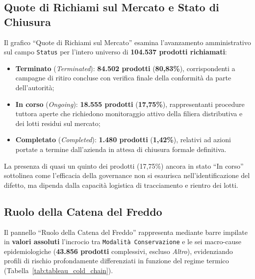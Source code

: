 
\subsection{Quote di Richiami sul Mercato e Stato di Chiusura}

Il grafico ``Quote di Richiami sul Mercato'' esamina l'avanzamento amministrativo sul campo \texttt{Status} per l'intero universo di \textbf{104.537 prodotti richiamati}:
\begin{itemize}
    \item \textbf{Terminato} (\textit{Terminated}): \textbf{84.502 prodotti} (\textbf{80,83\%}), corrispondenti a campagne di ritiro concluse con verifica finale della conformità da parte dell'autorità;
    \item \textbf{In corso} (\textit{Ongoing}): \textbf{18.555 prodotti} (\textbf{17,75\%}), rappresentanti procedure tuttora aperte che richiedono monitoraggio attivo della filiera distributiva e dei lotti residui sul mercato;
    \item \textbf{Completato} (\textit{Completed}): \textbf{1.480 prodotti} (\textbf{1,42\%}), relativi ad azioni portate a termine dall'azienda in attesa di chiusura formale definitiva.
\end{itemize}
La presenza di quasi un quinto dei prodotti (17,75\%) ancora in stato ``In corso'' sottolinea come l'efficacia della governance non si esaurisca nell'identificazione del difetto, ma dipenda dalla capacità logistica di tracciamento e rientro dei lotti.

\subsection{Ruolo della Catena del Freddo}

Il pannello ``Ruolo della Catena del Freddo'' rappresenta mediante barre impilate in \textbf{valori assoluti} l'incrocio tra \texttt{Modalità Conservazione} e le sei macro-cause epidemiologiche (\textbf{43.856 prodotti} complessivi, escluso \textit{Altro}), evidenziando profili di rischio profondamente differenziati in funzione del regime termico (Tabella~\ref{tab:tableau_cold_chain}).

